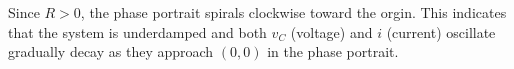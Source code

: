 \documentclass[preview]{standalone}
\begin{document}
\begin{center}
\raggedright
                    Since $R > 0$, the phase portrait spirals clockwise toward the orgin. This indicates
                    that the system is underdamped and both $v_C$ (voltage) and $i$ (current) oscillate 
                    gradually decay as they approach $(0,0)$ in the phase portrait.
\end{center}
\end{document}
